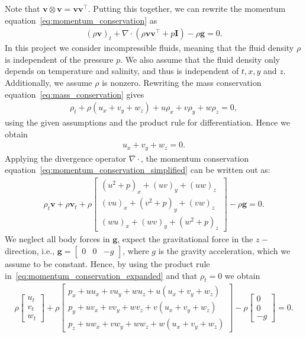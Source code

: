 Note that $\mathbf{v} \otimes \mathbf{v} = \mathbf{v} \mathbf{v}^\top$.
Putting this together, we can rewrite the momentum equation~\eqref{eq:momentum_conservation} as
\begin{align}\label{eq:momentum_conservation_simplified}
    {(\rho \mathbf{v})}_t + \nabla \cdot (\rho \mathbf{v} \mathbf{v}^\top  + p \mathbf{I}) - \rho \mathbf{g} = 0.
\end{align}
In this project we consider incompressible fluids, meaning that the fluid density $\rho$ is independent of the pressure $p$.
We also assume that the fluid density only depends on temperature and salinity, and thus is independent of $t, x, y$ and $z$.
Additionally, we assume $\rho$ is nonzero.
Rewriting the mass conservation equation~\eqref{eq:mass_conservation} gives
\begin{align*}
    \rho_t + \rho(u_x + v_y + w_z) + u \rho_x + v \rho_y + w \rho_z = 0,
\end{align*}
using the given assumptions and the product rule for differentiation.
Hence we obtain
\begin{align}
    u_x + v_y + w_z = 0. \label{eq:mass_conservation_incompressible}
\end{align}
Applying the divergence operator $\nabla \cdot$, the momentum conservation equation~\eqref{eq:momentum_conservation_simplified} can be written out as:
\begin{align}\label{eq:momentum_conservation_expanded}
    \rho_t \mathbf{v} + \rho \mathbf{v}_t + \rho \begin{bmatrix}
        {(u^2 + p)}_x + {(uv)}_y + {(uw)}_z \\
        {(vu)}_x + {(v^2 + p)}_y + {(vw)}_z \\
        {(wu)}_x + {(wv)}_y + {(w^2 + p)}_z 
    \end{bmatrix}
    - \rho \mathbf{g} = 0.
\end{align}
We neglect all body forces in $\mathbf{g}$, expect the gravitational force in the $z-$direction, i.e., $\mathbf{g} = \begin{bmatrix} 0 & 0 & -g \end{bmatrix}$, where $g$ is the gravity acceleration, which we assume to be constant.
Hence, by using the product rule in~\eqref{eq:momentum_conservation_expanded} and that $\rho_t = 0$ we obtain
\begin{align}\label{eq:momentum_conservation_expanded_final}
    \rho \begin{bmatrix}
        u_t \\ v_t \\ w_t
    \end{bmatrix}
    + \rho \begin{bmatrix}
        p_x + u u_x + v u_y + w u_z + u(u_x + v_y + w_z) \\
        p_y + u v_x + v v_y + w v_z + v(u_x + v_y + w_z) \\
        p_z + u w_x + v w_y + w w_z + w(u_x + v_y + w_z) 
    \end{bmatrix}
    - \rho \begin{bmatrix}
        0 \\ 0 \\ -g
    \end{bmatrix} = 0.
\end{align}
